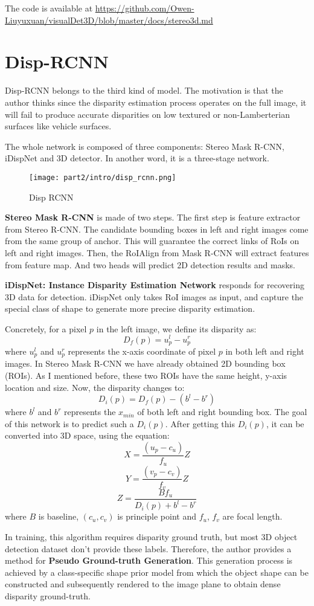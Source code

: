 \documentclass[12pt]{article}
\begin{document}
The code is available at \url{ https://github.com/Owen-Liuyuxuan/visualDet3D/blob/master/docs/stereo3d.md}
\section{Disp-RCNN\cite{disp_rcnn}}
Disp-RCNN belongs to the third kind of model. The motivation is that the author thinks since the disparity estimation process operates on the full image, it will fail to produce accurate disparities on low textured or non-Lamberterian surfaces like vehicle surfaces. 

The whole network is composed of three components: Stereo Mask R-CNN, iDispNet and 3D detector. In another word, it is a three-stage network.
\begin{figure}[H]
    \centering
    \texttt{[image: part2/intro/disp\_rcnn.png]}
    \caption{Disp RCNN}
    \label{disp_rcnn}
\end{figure}
\textbf{Stereo Mask R-CNN} is made of two steps. The first step is feature extractor from Stereo R-CNN. The candidate bounding boxes in left and right images come from the same group of anchor. This will guarantee the correct links of RoIs on left and right images. Then, the RoIAlign from Mask R-CNN will extract features from feature map. And two heads will predict 2D detection results and masks.

\textbf{iDispNet: Instance Disparity Estimation Network} responds for recovering 3D data for detection. iDispNet only takes RoI images as input, and capture the special class of shape to generate more precise disparity estimation.

Concretely, for a pixel $p$ in the left image, we define its disparity as:
$$D_f(p)=u_p^l-u_p^r$$
where $u_p^l$ and $u_p^r$ represents the x-axis coordinate of pixel $p$ in both left and right images. In Stereo Mask R-CNN we have already obtained 2D bounding box (ROIs). As I mentioned before, these two ROIs have the same height, y-axis location and size. Now, the disparity changes to:
$$D_i(p)=D_f(p)-(b^l-b^r)$$
where $b^l$ and $b^r$ represents the $x_{min}$ of both left and right bounding box. The goal of this network is to predict such a $D_i(p)$. After getting this $D_i(p)$, it can be converted into 3D space, using the equation:
$$X = \frac{(u_p-c_u)}{f_u}Z$$$$Y = \frac{(v_p-c_v)}{f_v}Z$$$$Z=\frac{Bf_u}{D_i(p)+b^l-b^r}$$
where $B$ is baseline, $(c_u,c_v)$ is principle point and $f_u$, $f_v$ are focal length.

In training, this algorithm requires disparity ground truth, but most 3D object detection dataset don't provide these labels. Therefore, the author provides a method for \textbf{Pseudo Ground-truth Generation}. This generation process is achieved by a class-specific shape prior model from which the object shape can be constructed and subsequently rendered to the image plane to obtain dense disparity ground-truth.
\end{document}
